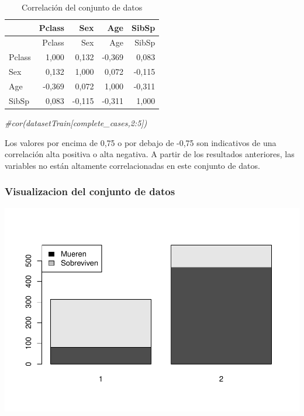 \documentclass[]{article}
\newenvironment{Shaded}{\begin{snugshade}}{\end{snugshade}}
\newcommand{\KeywordTok}[1]{\textcolor[rgb]{0.13,0.29,0.53}{\textbf{#1}}}
\newcommand{\DataTypeTok}[1]{\textcolor[rgb]{0.13,0.29,0.53}{#1}}
\newcommand{\DecValTok}[1]{\textcolor[rgb]{0.00,0.00,0.81}{#1}}
\newcommand{\StringTok}[1]{\textcolor[rgb]{0.31,0.60,0.02}{#1}}
\newcommand{\CommentTok}[1]{\textcolor[rgb]{0.56,0.35,0.01}{\textit{#1}}}
\newcommand{\OperatorTok}[1]{\textcolor[rgb]{0.81,0.36,0.00}{\textbf{#1}}}
\newcommand{\NormalTok}[1]{#1}
\begin{document}
\begin{longtable}[]{@{}lrrrr@{}}
\caption{Correlación del conjunto de datos}\tabularnewline
\toprule
& Pclass & Sex & Age & SibSp\tabularnewline
\midrule
\endfirsthead
\toprule
& Pclass & Sex & Age & SibSp\tabularnewline
\midrule
\endhead
Pclass & 1,000 & 0,132 & -0,369 & 0,083\tabularnewline
Sex & 0,132 & 1,000 & 0,072 & -0,115\tabularnewline
Age & -0,369 & 0,072 & 1,000 & -0,311\tabularnewline
SibSp & 0,083 & -0,115 & -0,311 & 1,000\tabularnewline
\bottomrule
\end{longtable}

\begin{Shaded}
\begin{Highlighting}[]
\CommentTok{#cor(datasetTrain[complete_cases,2:5])}
\end{Highlighting}
\end{Shaded}

Los valores por encima de 0,75 o por debajo de -0,75 son indicativos de
una correlación alta positiva o alta negativa. A partir de los
resultados anteriores, las variables no están altamente correlacionadas
en este conjunto de datos.

\subsubsection{Visualizacion del conjunto de
datos}\label{visualizacion-del-conjunto-de-datos}

\begin{Shaded}
\end{Shaded}

\includegraphics{titanicDataClean_files/figure-latex/datasetTrain_plot_01-1.pdf}
\end{document}

